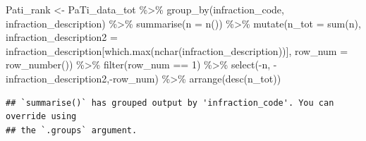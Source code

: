 \documentclass[
]{article}
\newenvironment{Shaded}{\begin{snugshade}}{\end{snugshade}}
\newcommand{\AttributeTok}[1]{\textcolor[rgb]{0.77,0.63,0.00}{#1}}
\newcommand{\DecValTok}[1]{\textcolor[rgb]{0.00,0.00,0.81}{#1}}
\newcommand{\FunctionTok}[1]{\textcolor[rgb]{0.00,0.00,0.00}{#1}}
\newcommand{\NormalTok}[1]{#1}
\newcommand{\OtherTok}[1]{\textcolor[rgb]{0.56,0.35,0.01}{#1}}
\newcommand{\SpecialCharTok}[1]{\textcolor[rgb]{0.00,0.00,0.00}{#1}}
\begin{document}
\begin{Shaded}
\begin{Highlighting}[]
\NormalTok{Pati\_rank }\OtherTok{\textless{}{-}}\NormalTok{ PaTi\_data\_tot }\SpecialCharTok{\%\textgreater{}\%} 
  \FunctionTok{group\_by}\NormalTok{(infraction\_code, infraction\_description) }\SpecialCharTok{\%\textgreater{}\%} 
  \FunctionTok{summarise}\NormalTok{(}\AttributeTok{n =} \FunctionTok{n}\NormalTok{()) }\SpecialCharTok{\%\textgreater{}\%} 
  \FunctionTok{mutate}\NormalTok{(}\AttributeTok{n\_tot =} \FunctionTok{sum}\NormalTok{(n),}
         \AttributeTok{infraction\_description2 =}\NormalTok{ infraction\_description[}\FunctionTok{which.max}\NormalTok{(}\FunctionTok{nchar}\NormalTok{(infraction\_description))],}
         \AttributeTok{row\_num =} \FunctionTok{row\_number}\NormalTok{()) }\SpecialCharTok{\%\textgreater{}\%} 
  \FunctionTok{filter}\NormalTok{(row\_num }\SpecialCharTok{==} \DecValTok{1}\NormalTok{) }\SpecialCharTok{\%\textgreater{}\%} 
  \FunctionTok{select}\NormalTok{(}\SpecialCharTok{{-}}\NormalTok{n, }\SpecialCharTok{{-}}\NormalTok{infraction\_description2,}\SpecialCharTok{{-}}\NormalTok{row\_num) }\SpecialCharTok{\%\textgreater{}\%} 
  \FunctionTok{arrange}\NormalTok{(}\FunctionTok{desc}\NormalTok{(n\_tot))}
\end{Highlighting}
\end{Shaded}

\begin{verbatim}
## `summarise()` has grouped output by 'infraction_code'. You can override using
## the `.groups` argument.
\end{verbatim}
\end{document}

